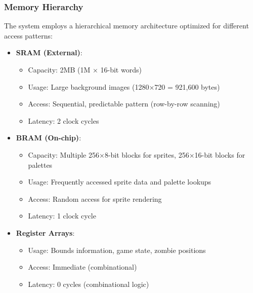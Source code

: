 \documentclass[12pt,a4paper]{article}
\begin{document}
\subsubsection{Memory Hierarchy}
The system employs a hierarchical memory architecture optimized for different access patterns:
\begin{itemize}
    \item \textbf{SRAM (External)}: 
    \begin{itemize}
        \item Capacity: 2MB (1M × 16-bit words)
        \item Usage: Large background images (1280×720 = 921,600 bytes)
        \item Access: Sequential, predictable pattern (row-by-row scanning)
        \item Latency: 2 clock cycles
    \end{itemize}
    \item \textbf{BRAM (On-chip)}:
    \begin{itemize}
        \item Capacity: Multiple 256×8-bit blocks for sprites, 256×16-bit blocks for palettes
        \item Usage: Frequently accessed sprite data and palette lookups
        \item Access: Random access for sprite rendering
        \item Latency: 1 clock cycle
    \end{itemize}
    \item \textbf{Register Arrays}:
    \begin{itemize}
        \item Usage: Bounds information, game state, zombie positions
        \item Access: Immediate (combinational)
        \item Latency: 0 cycles (combinational logic)
    \end{itemize}
\end{itemize}
\end{document}
